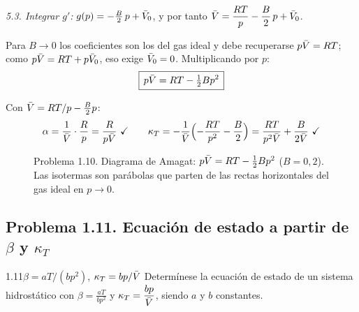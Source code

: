 \begin{resolucion}
\emph{5.3. Integrar $g'$:} $g(p)=-\frac B2\,p+\bar{V}_0$, y por tanto
$\displaystyle\bar{V}=\frac{RT}{p}-\frac B2\,p+\bar{V}_0$.

 Para $B\to0$ los coeficientes son los del gas ideal y debe recuperarse
$p\bar{V}=RT$; como $p\bar{V}=RT+p\bar{V}_0$, eso exige $\bar{V}_0=0$. Multiplicando por $p$:
\[
  \boxed{\,p\bar{V}=RT-\tfrac12Bp^2\,}
\]

 Con $\bar{V}=RT/p-\tfrac B2p$:
\[
  \alpha=\frac1{\bar{V}}\cdot\frac Rp=\frac{R}{p\bar{V}}\ \checkmark\qquad
  \kappa_T=-\frac1{\bar{V}}\Bigl(-\frac{RT}{p^2}-\frac B2\Bigr)=\frac{RT}{p^2\bar{V}}+\frac{B}{2\bar{V}}\ \checkmark
\]
\end{resolucion}

\begin{figure}[htbp]
\centering
{}
\caption{Problema 1.10. Diagrama de Amagat: $p\bar{V}=RT-\tfrac12Bp^2$ ($B=0{,}2$). Las isotermas son
parábolas que parten de las rectas horizontales del gas ideal en $p\to0$.}
\label{fig:p110}
\end{figure}

\subsection{Problema 1.11. Ecuación de estado a partir de \texorpdfstring{$\beta$}{beta} y \texorpdfstring{$\kappa_T$}{kappa}}
\begin{problema}{1.11}{$\beta=aT/(bp^2)$, $\kappa_T=bp/\bar{V}$}
Determínese la ecuación de estado de un sistema hidrostático con $\displaystyle\beta=\frac{aT}{bp^2}$ y
$\displaystyle\kappa_T=\frac{bp}{\bar{V}}$, siendo $a$ y $b$ constantes.
\end{problema}


